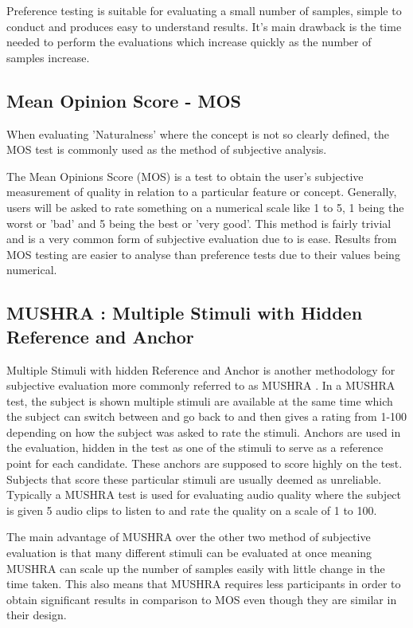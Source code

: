 \documentclass[bsc,frontabs,twoside,singlespacing,parskip]{infthesis}
\begin{document}
Preference testing is suitable for evaluating a small number of samples, simple to conduct and produces easy to understand results. It's main drawback is the time needed to perform the evaluations which increase quickly as the number of samples increase.

\subsection{Mean Opinion Score - MOS}

When evaluating 'Naturalness' where the concept is not so clearly defined, the MOS test is commonly used as the method of subjective analysis. \cite{mos}

The Mean Opinions Score (MOS) is a test to obtain the user's subjective measurement of quality in relation to a particular feature or concept. Generally, users will be asked to rate something on a numerical scale like 1 to 5, 1 being the worst or 'bad' and 5 being the best or 'very good'. This method is fairly trivial and is a very common form of subjective evaluation due to is ease. Results from MOS testing are easier to analyse than preference tests due to their values being numerical.

\subsection{MUSHRA : Multiple Stimuli with Hidden Reference and Anchor}

Multiple Stimuli with hidden Reference and Anchor is another methodology for subjective evaluation more commonly referred to as MUSHRA \cite{mushra}. In a MUSHRA test, the subject is shown multiple stimuli are available at the same time which the subject can switch between and go back to and then gives a rating from 1-100 depending on how the subject was asked to rate the stimuli. Anchors are used in the evaluation, hidden in the test as one of the stimuli to serve as a reference point for each candidate. These anchors are supposed to score highly on the test. Subjects that score these particular stimuli are usually deemed as unreliable. Typically a MUSHRA test is used for evaluating audio quality \cite{mushra_bbc} where the subject is given 5 audio clips to listen to and rate the quality on a scale of 1 to 100.

The main advantage of MUSHRA over the other two method of subjective evaluation is that many different stimuli can be evaluated at once meaning MUSHRA can scale up the number of samples easily with little change in the time taken. This also means that MUSHRA requires less participants in order to obtain significant results in comparison to MOS even though they are similar in their design.
\end{document}
